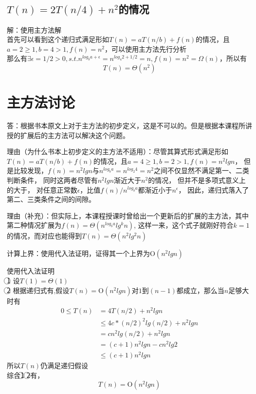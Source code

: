 \documentclass[cn,11pt,chinese]{elegantbook}
\begin{document}
\subsection{$T(n) = 2T(n/4)+n^2$的情况}
  解：使用主方法解\\
  首先可以看到这个递归式满足形如$T(n) = aT(n/b) + f(n)$的情况，且$a=2 \ge 1,b=4 > 1,f(n) = n^2$，可以使用主方法先行分析\\
  那么有$\exists \epsilon = 1/2 > 0,s.t. n^{log_b a +\epsilon } = n^{log_4 2+1/2} = n,f(n) = n^2 = \Omega (n)$，所以有
  $$T(n) = \Theta (n^2)$$

\section{主方法讨论}

答：根据书本原文上对于主方法的初步定义，这是不可以的。但是根据本课程所讲授的扩展后的主方法可以解决这个问题。

理由（为什么书本上初步定义的主方法不适用）：尽管其算式形式满足形如$T(n) = aT(n/b) + f(n)$的情况，且$a=4 \ge 1,b=2 > 1,f(n) = n^2lgn$，
    但是比较发现，$f(n)=n^2lgn$与$n^{log_b a} = n^{log_2 4} = n^2$之间不仅显然不满足第一、二类判断条件，
    同时这两者尽管有$n^2lgn$渐近大于$n^2$的情况， 但并不是多项式意义上的大于，
    对任意正常数$\epsilon$，比值$f(n)/n^{log_b a}$都渐近小于$n^{\epsilon}$，
    因此，递归式落入了第二、三类条件之间的间隙。

理由（补充）：但实际上，本课程授课时曾给出一个更新后的扩展的主方法，其中第二种情况扩展为$f(n) = \Theta (n^{log_b a} lg^k n)$,
            这样一来，这个式子就刚好符合$k=1$的情况，而对应也能得到$T(n) = \Theta (n^2 lg^2 n)$

计算上界：使用代入法证明，证得其一个上界为$\mathrm{O} (n^2lgn)$

  使用代入法证明\\
  \textcircled{1} 设$T(1) = \Theta (1)$\\
  \textcircled{2} 根据递归式有,假设$T(n) = \mathrm{O}(n^2lgn)$对$1$到$(n-1)$都成立，那么当$n$足够大时有
  \begin{equation}
    \begin{aligned}
        0\le T(n) &= 4T(n/2) + n^2lgn \\
                  &\le 4c*(n/2)^2lg(n/2) + n^2lgn \\
                  &= cn^2lg(n/2) + n^2lgn \\
                  &= (c+1)n^2lgn-cn^2lg2 \\
                  &\le (c+1)n^2lgn
    \end{aligned}
  \end{equation}
  所以$T(n)$仍满足递归假设\\
  综合\textcircled{1} \textcircled{2}有，
  $$T(n) = \mathrm{O} (n^2lgn)$$
\end{document}
